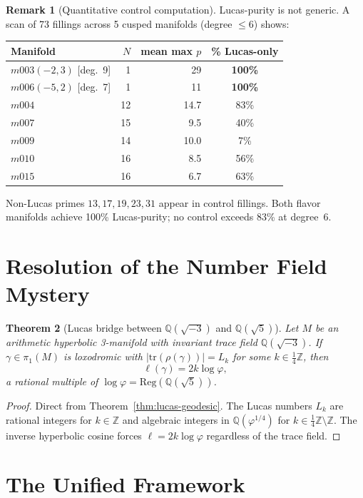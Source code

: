 \documentclass[12pt]{article}
\newtheorem{theorem}{Theorem}
\theoremstyle{definition}
\newtheorem{remark}[theorem]{Remark}
\newcommand{\Z}{\mathbb{Z}}
\newcommand{\Q}{\mathbb{Q}}
\newcommand{\ph}{\varphi}
\newcommand{\logph}{\log\ph}
\begin{document}
\begin{remark}[Quantitative control computation]
Lucas-purity is not generic. A scan of 73 fillings across 5 cusped
manifolds (degree $\leq 6$) shows:
\begin{center}
\begin{tabular}{lrrc}
\toprule
Manifold & $N$ & mean max $p$ & \% Lucas-only \\
\midrule
$m003(-2,3)$ [deg.~9] & 1 & 29 & \textbf{100\%} \\
$m006(-5,2)$ [deg.~7] & 1 & 11 & \textbf{100\%} \\
$m004$  & 12 & 14.7 & 83\% \\
$m007$  & 15 &  9.5 & 40\% \\
$m009$  & 14 & 10.0 &  7\% \\
$m010$  & 16 &  8.5 & 56\% \\
$m015$  & 16 &  6.7 & 63\% \\
\bottomrule
\end{tabular}
\end{center}
Non-Lucas primes $13, 17, 19, 23, 31$ appear in control fillings.
Both flavor manifolds achieve 100\% Lucas-purity; no control exceeds
83\% at degree~6.
\end{remark}

\section{Resolution of the Number Field Mystery}

\begin{theorem}[Lucas bridge between $\Q(\sqrt{-3})$ and $\Q(\sqrt{5})$]
\label{thm:bridge}
Let $M$ be an arithmetic hyperbolic 3-manifold with invariant trace
field $\Q(\sqrt{-3})$. If $\gamma \in \pi_1(M)$ is loxodromic with
$|\mathrm{tr}(\rho(\gamma))| = L_k$ for some $k \in \frac{1}{4}\Z$,
then
\[
  \ell(\gamma) = 2k\logph,
\]
a rational multiple of $\logph = \mathrm{Reg}(\Q(\sqrt{5}))$.
\end{theorem}

\begin{proof}
Direct from Theorem~\ref{thm:lucas-geodesic}. The Lucas numbers
$L_k$ are rational integers for $k \in \Z$ and algebraic integers
in $\Q(\ph^{1/4})$ for $k \in \frac{1}{4}\Z \setminus \Z$.
The inverse hyperbolic cosine forces $\ell = 2k\logph$ regardless
of the trace field.
\end{proof}

\section{The Unified Framework}
\end{document}
